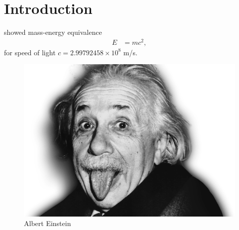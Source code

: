 
\section{Introduction}
\label{sec:introduction}

\cite{einstein} showed mass-energy equivalence
%
\begin{align}
  \label{eq:1}
  E &= mc^2,
\end{align}
%
for speed of light $c= 2.99792458 \times 10^{8}$ m/s.

\begin{figure}[!h]
  \centering
  \includegraphics[scale=0.25]{fig/einstein.png}
  \caption{Albert Einstein}
  \label{fig:einstein}
\end{figure}

